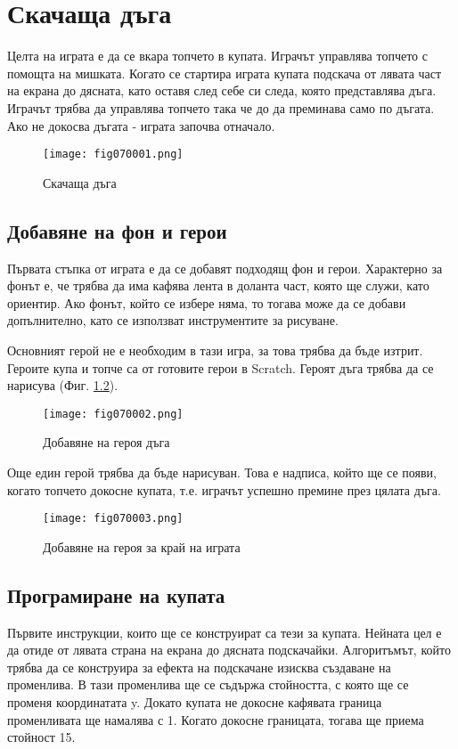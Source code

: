 \chapter{Скачаща дъга}

Целта на играта е да се вкара топчето в купата. Играчът управлява топчето с помощта на мишката. Когато се стартира играта купата подскача от лявата част на екрана до дясната, като оставя след себе си следа, която представлява дъга. Играчът трябва да управлява топчето така че до да преминава само по дъгата. Ако не докосва дъгата - играта започва отначало.

\begin{figure}[H]
  \centering
  \texttt{[image: fig070001.png]}
  \caption{Скачаща дъга}
\label{fig070001}
\end{figure}

\section{Добавяне на фон и герои}
Първата стъпка от играта е да се добавят подходящ фон и герои. Характерно за фонът е, че трябва да има кафява лента в доланта част, която ще служи, като ориентир. Ако фонът, който се избере няма, то тогава може да се добави допълнително, като се използват инструментите за рисуване.

Основният герой не е необходим в тази игра, за това трябва да бъде изтрит. Героите купа и топче са от готовите герои в Scratch. Героят дъга трябва да се нарисува (Фиг. \ref{fig070002}).

\begin{figure}[H]
  \centering
  \texttt{[image: fig070002.png]}
  \caption{Добавяне на героя дъга}
\label{fig070002}
\end{figure}

Още един герой трябва да бъде нарисуван. Това е надписа, който ще се появи, когато топчето докосне купата, т.е. играчът успешно премине през цялата дъга.

\begin{figure}[H]
  \centering
  \texttt{[image: fig070003.png]}
  \caption{Добавяне на героя за край на играта}
\label{fig070003}
\end{figure}

\section{Програмиране на купата}
Първите инструкции, които ще се конструират са тези за купата. Нейната цел е да отиде от лявата страна на екрана до дясната подскачайки. Алгоритъмът, който трябва да се конструира за ефекта на подскачане изисква създаване на променлива. В тази променлива ще се съдържа стойността, с която ще се променя координатата y. Докато купата не докосне кафявата граница променливата ще намалява с 1. Когато докосне границата, тогава ще приема стойност 15.

